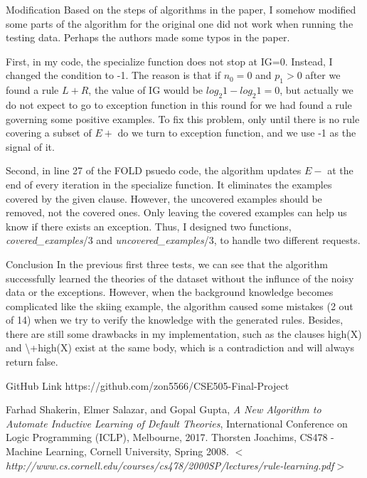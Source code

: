 \documentclass[12pt,a4paper]{article}
\begin{document}
	\begin{section}{Modification}
		Based on the steps of algorithms in the paper, I somehow modified some parts of the algorithm for the original one did not work when running the testing data. Perhaps the authors made some typos in the paper.

		First, in my code, the specialize function does not stop at IG=0. Instead, I changed the condition to -1. The reason is that if $n_0=0$ and $p_1 > 0$ after we found a rule $L+R$, the value of IG would be $log_2{1}-log_2{1}=0$, but actually we do not expect to go to exception function in this round for we had found a rule governing some positive examples. To fix this problem, only until there is no rule covering a subset of $E+$ do we turn to exception function, and we use -1 as the signal of it.

		Second, in line 27 of the FOLD psuedo code, the algorithm updates $E-$ at the end of every iteration in the specialize function. It eliminates the examples covered by the given clause. However, the uncovered examples should be removed, not the covered ones. Only leaving the covered examples can help us know if there exists an exception. Thus, I designed two functions, \emph{covered\_examples}/3 and \emph{uncovered\_examples}/3, to handle two different requests.

	\end{section}
	\begin{section}{Conclusion}
		In the previous first three tests, we can see that the algorithm successfully learned the theories of the dataset without the influnce of the noisy data or the exceptions. However, when the background knowledge becomes complicated like the skiing example, the algorithm caused some mistakes (2 out of 14) when we try to verify the knowledge with the generated rules. Besides, there are still some drawbacks in my implementation, such as the clauses high(X) and \textbackslash{+high(X)} exist at the same body, which is a contradiction and will always return false.
	\end{section}

	\begin{section}{GitHub Link}
		https://github.com/zon5566/CSE505-Final-Project
	\end{section}

	\begin{thebibliography}{unsrt}
		 Farhad Shakerin, Elmer Salazar, and Gopal Gupta, \textit{A New Algorithm to Automate Inductive Learning of Default Theories}, International Conference on Logic Programming (ICLP), Melbourne, 2017.
		 Thorsten Joachims, CS478 - Machine Learning, Cornell University, Spring 2008. \textit{$<$http://www.cs.cornell.edu/courses/cs478/2000SP/lectures/rule-learning.pdf$>$}
	\end{thebibliography}
\end{document}
